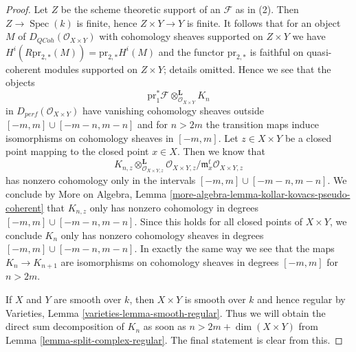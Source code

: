 \documentclass{stacks-project}
\theoremstyle{plain}
\theoremstyle{definition}
\theoremstyle{remark}
\numberwithin{equation}{subsection}
\def\Spec{\mathop{\mathrm{Spec}}}
\def\QCoh{\mathit{QCoh}}
\begin{document}
\begin{proof}
Let $Z$ be the scheme theoretic support of an $\mathcal{F}$ as in (2).
Then $Z \to \Spec(k)$ is finite, hence $Z \times Y \to Y$ is finite.
It follows that for an object $M$ of $D_\QCoh(\mathcal{O}_{X \times Y})$
with cohomology sheaves supported on $Z \times Y$ we have
$H^i(R\text{pr}_{2, *}(M)) = \text{pr}_{2, *}H^i(M)$ and the functor
$\text{pr}_{2, *}$ is faithful on quasi-coherent modules supported
on $Z \times Y$; details omitted. Hence we see that the objects
$$
\text{pr}_1^*\mathcal{F} \otimes_{\mathcal{O}_{X \times Y}}^\mathbf{L} K_n
$$
in $D_{perf}(\mathcal{O}_{X \times Y})$ have vanishing cohomology sheaves
outside $[-m, m] \cup [-m - n, m - n]$ and for $n > 2m$ the transition maps
induce isomorphisms on cohomology sheaves in $[-m, m]$.
Let $z \in X \times Y$ be a closed point mapping to the closed point
$x \in X$. Then we know that
$$
K_{n, z} \otimes_{\mathcal{O}_{X \times Y, z}}^\mathbf{L}
\mathcal{O}_{X \times Y, z}/\mathfrak m_x^t\mathcal{O}_{X \times Y, z}
$$
has nonzero cohomology only in the intervals
$[-m, m] \cup [-m - n, m - n]$.
We conclude by More on Algebra, Lemma
\ref{more-algebra-lemma-kollar-kovacs-pseudo-coherent}
that $K_{n, z}$ only has nonzero cohomology
in degrees $[-m, m] \cup [-m - n, m - n]$. Since this holds for all
closed points of $X \times Y$, we conclude $K_n$ only has nonzero
cohomology sheaves in degrees $[-m, m] \cup [-m - n, m - n]$.
In exactly the same way we see that the maps $K_n \to K_{n + 1}$
are isomorphisms on cohomology sheaves in degrees $[-m, m]$
for $n > 2m$.

\medskip\noindent
If $X$ and $Y$ are smooth over $k$, then $X \times Y$ is smooth
over $k$ and hence regular by
Varieties, Lemma \ref{varieties-lemma-smooth-regular}.
Thus we will obtain the direct sum decomposition of $K_n$
as soon as $n > 2m + \dim(X \times Y)$ from
Lemma \ref{lemma-split-complex-regular}. The final statement
is clear from this.
\end{proof}
\end{document}
